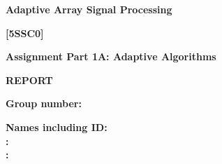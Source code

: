 \documentclass[12pt]{article}
\renewcommand{\_}{\kern-1.5pt\textunderscore\kern-1.5pt}
\begin{document}
\vspace{\baselineskip}
\tab \tab 
\vspace{\baselineskip}
\vspace{\baselineskip}
\vspace{\baselineskip}\begin{Center}
{\fontsize{18pt}{21.6pt}\selectfont \textbf{Adaptive Array Signal Processing}\par}
\end{Center}\par

\begin{Center}
{\fontsize{18pt}{21.6pt}\selectfont \textbf{[5SSC0]}\par}
\end{Center}\par


\vspace{\baselineskip}
\begin{Center}
{\fontsize{18pt}{21.6pt}\selectfont \textbf{Assignment Part 1A: Adaptive Algorithms }\par}
\end{Center}\par


\vspace{\baselineskip}
\begin{Center}
{\fontsize{18pt}{21.6pt}\selectfont \textbf{REPORT}\par}
\end{Center}\par


\vspace{\baselineskip}

\vspace{\baselineskip}

\vspace{\baselineskip}

\vspace{\baselineskip}

\vspace{\baselineskip}

\vspace{\baselineskip}

\vspace{\baselineskip}

\vspace{\baselineskip}
\textbf{Group number: } %
\par

\textbf{Names including ID:\\
: } %
\\
\textbf{: } %
\par
\end{document}
